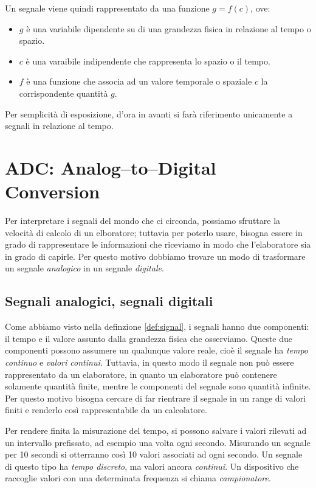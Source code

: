 \documentclass[a4paper,11pt,twoside,openright]{unibo}
\begin{document}
Un segnale viene quindi rappresentato da una funzione $g = f(c)$, ove:
\begin{itemize}
    \item $g$ \`e una variabile dipendente su di una grandezza fisica in
    relazione al tempo o spazio.
    \item $c$ \`e una varaibile indipendente che rappresenta lo spazio o il
    tempo.
    \item $f$ \`e una funzione che associa ad un valore temporale o spaziale $c$
    la corrispondente quantit\`a $g$.
\end{itemize}

Per semplicit\`a di esposizione, d'ora in avanti si far\`a riferimento
unicamente a segnali in relazione al tempo.
\section{ADC: Analog--to--Digital Conversion}
Per interpretare i segnali del mondo che ci circonda, possiamo sfruttare la
velocit\`a di calcolo di un elboratore; tuttavia per poterlo usare, bisogna
essere in grado di rappresentare le informazioni che riceviamo in modo che
l'elaboratore sia in grado di capirle. Per questo motivo dobbiamo trovare un
modo di trasformare un segnale \emph{analogico} in un segnale \emph{digitale}.
\subsection{Segnali analogici, segnali digitali}
Come abbiamo visto nella definzione \ref{def:signal}, i segnali hanno due
componenti: il tempo e il valore assunto dalla grandezza fisica che osserviamo.
Queste due componenti possono assumere un qualunque valore reale, cio\`e il
segnale ha \emph{tempo continuo} e \emph{valori continui}. Tuttavia, in questo
modo il segnale non pu\`o essere rappresentato da un elaboratore, in quanto un
elaboratore pu\`o contenere solamente quantit\`a finite, mentre le componenti
del segnale sono quantit\`a infinite. Per questo motivo bisogna cercare di far
rientrare il segnale in un range di valori finiti e renderlo cos\`i
rappresentabile da un calcolatore.

Per rendere finita la misurazione del tempo, si possono salvare i valori
rilevati ad un intervallo prefissato, ad esempio una volta ogni secondo.
Misurando un segnale per 10 secondi si otterranno cos\`i 10 valori associati ad
ogni secondo. Un segnale di questo tipo ha \emph{tempo discreto}, ma valori
ancora \emph{continui}. Un dispositivo che raccoglie valori con una determinata
frequenza si chiama \emph{campionatore}.
\end{document}

